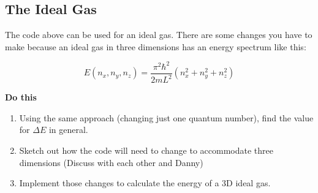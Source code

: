 \subsection{The Ideal Gas}\label{the-ideal-gas}

The code above can be used for an ideal gas. There are some changes you
have to make because an ideal gas in three dimensions has an energy
spectrum like this:

\[E(n_x,n_y,n_z) = \dfrac{\pi^2\hbar^2}{2mL^2}\left(n_x^2+n_y^2+n_z^2\right)\]

\textbf{Do this}

\begin{enumerate}
\def\labelenumi{\arabic{enumi}.}
\tightlist
\item
  Using the same approach (changing just one quantum number), find the
  value for \(\Delta E\) in general.
\item
  Sketch out how the code will need to change to accommodate three
  dimensions (Discuss with each other and Danny)
\item
  Implement those changes to calculate the energy of a 3D ideal gas.
\end{enumerate}

\begin{Shaded}
\begin{Highlighting}[]
\end{Highlighting}
\end{Shaded}

\begin{Shaded}
\begin{Highlighting}[]

\end{Highlighting}
\end{Shaded}
